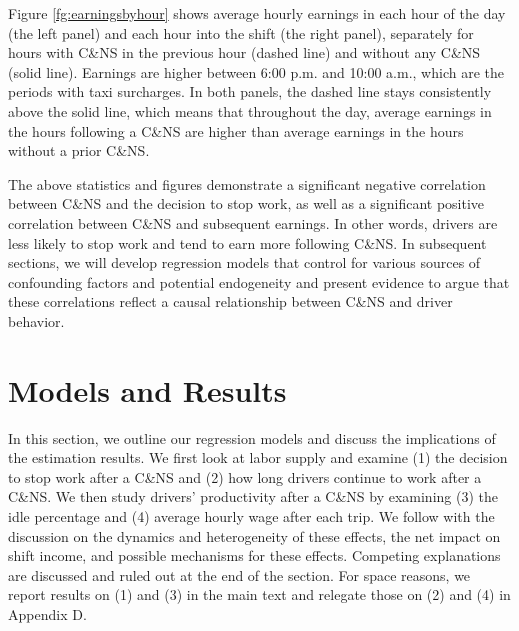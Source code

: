 \documentclass[reviewmode]{restat}
\begin{document}
Figure \ref{fg:earningsbyhour} shows average hourly earnings in each hour of the day (the left panel) and
each hour into the shift (the right panel), separately for hours with C\&NS in the previous hour 
(dashed line) and without any C\&NS (solid line). Earnings are higher between 6:00 p.m. and 10:00 a.m.,
which are the periods with taxi surcharges. In both panels, the dashed line stays consistently 
above the solid line, which means that throughout the day, average earnings in the hours following a 
C\&NS are higher than  average earnings in the hours without a prior C\&NS.

The above statistics and figures demonstrate a significant negative correlation between C\&NS and the 
decision to stop work, as well as a significant positive correlation between C\&NS and subsequent earnings.
In other words, drivers are less likely to stop work and tend to earn more following C\&NS. In subsequent
sections, we will develop regression models  that control for various sources of confounding factors and
potential endogeneity and present evidence to argue that these correlations reflect a causal relationship
between C\&NS and driver behavior.

\section{Models and Results}
\label{sec:main}


In this section, we outline our regression models and discuss the implications of the estimation results.
We first look at labor supply and examine (1) the decision to stop work after a C\&NS and (2) how long drivers
continue to work after a C\&NS. We then study drivers' productivity after a C\&NS by examining (3) the idle
percentage and (4) average hourly wage after each trip. We follow with the discussion on the dynamics and heterogeneity
of these effects, the net impact on shift income, and possible mechanisms for these effects. 
Competing explanations are discussed and ruled out at the end of the section. For space reasons, we report
results on (1) and (3) in the main text and relegate those on (2) and (4) in Appendix D. 
\end{document}

